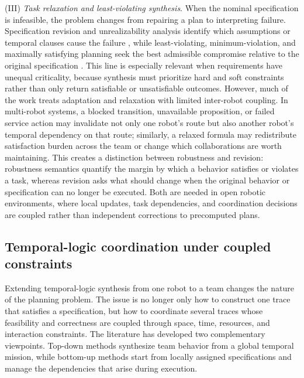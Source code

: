  (III) \emph{Task relaxation and least-violating synthesis}. When the nominal
specification is infeasible, the problem changes from repairing a plan to
interpreting failure. Specification revision and unrealizability analysis
identify which assumptions or temporal clauses cause the failure
\citep{fainekos2011revising, kim2012approximate, raman2011analyzing}, while
least-violating, minimum-violation, and maximally satisfying planning seek the
best admissible compromise relative to the original specification
\citep{tumova2013least, tumova2013minimum, lahijanian2015time,
tumova2014maximally}. This line is especially relevant when requirements have
unequal criticality, because synthesis must prioritize hard and soft
constraints rather than only return satisfiable or unsatisfiable outcomes.
However, much of the work treats adaptation and relaxation with limited
inter-robot coupling. In multi-robot systems, a blocked transition, unavailable
proposition, or failed service action may invalidate not only one robot's route
but also another robot's temporal dependency on that route; similarly, a relaxed
formula may redistribute satisfaction burden across the team or change which
collaborations are worth maintaining. This creates a distinction between
robustness and revision: robustness semantics quantify the margin by which a
behavior satisfies or violates a task, whereas revision asks what should change
when the original behavior or specification can no longer be executed. Both are
needed in open robotic environments, where local updates, task dependencies,
and coordination decisions are coupled rather than independent corrections to
precomputed plans.


\subsection{Temporal-logic coordination under coupled constraints}
\label{sec:ch01:rw:coordination}

Extending temporal-logic synthesis from one robot to a team changes the nature of the
planning problem. The issue is no longer only how to construct one trace that satisfies a
specification, but how to coordinate several traces whose feasibility and correctness are
coupled through space, time, resources, and interaction constraints. The literature has
developed two complementary viewpoints. Top-down methods synthesize team behavior from a
global temporal mission, while bottom-up methods start from locally assigned
specifications and manage the dependencies that arise during execution.

